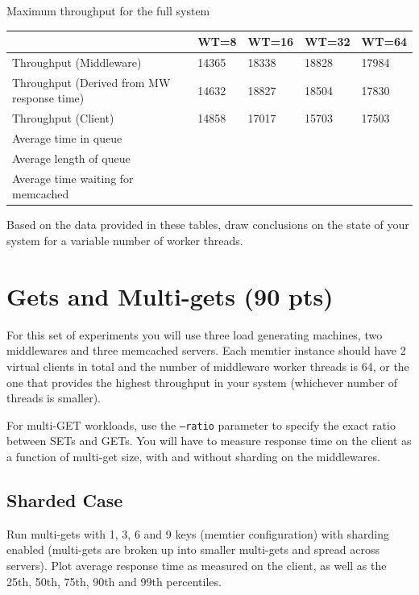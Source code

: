 \documentclass[11pt,a4paper]{article}
\begin{document}
\begin{center}
	{Maximum throughput for the full system}
	\begin{tabular}{|l|p{1.5cm}|p{1.5cm}|p{1.5cm}|p{1.5cm}|}
		\hline                                            & WT=8 & WT=16 & WT=32 & WT=64 \\ 
		\hline Throughput (Middleware)                    & 14365 & 18338 & 18828 & 17984 \\ 
		\hline Throughput (Derived from MW response time) & 14632 & 18827 & 18504 & 17830  \\ 
		\hline Throughput (Client)                     &14858 & 17017 & 15703 & 17503 \\ 
		\hline Average time in queue                      &      &       &       &       \\ 
		\hline Average length of queue                    &      &       &       &       \\ 
		\hline Average time waiting for memcached         &      &       &       &       \\ 
		\hline 
	\end{tabular}
\end{center}

Based on the data provided in these tables, draw conclusions on the state of your system for a variable number of worker threads.

\section{Gets and Multi-gets (90 pts)}

For this set of experiments you will use three load generating machines, two middlewares and three memcached servers. Each memtier instance should have 2 virtual clients in total and the number of middleware worker threads is 64, or the one that provides the highest throughput in your system (whichever number of threads is smaller).

For multi-GET workloads, use the \texttt{--ratio} parameter to specify the exact ratio between SETs and GETs. You will have to measure response time on the client as a function of multi-get size, with and without sharding on the middlewares.

\subsection{Sharded Case}

Run multi-gets with 1, 3, 6 and 9 keys (memtier configuration) with sharding enabled (multi-gets are broken up into smaller multi-gets and spread across servers). Plot average response time as measured on the client, as well as the 25th, 50th, 75th, 90th and 99th percentiles.
\end{document}
